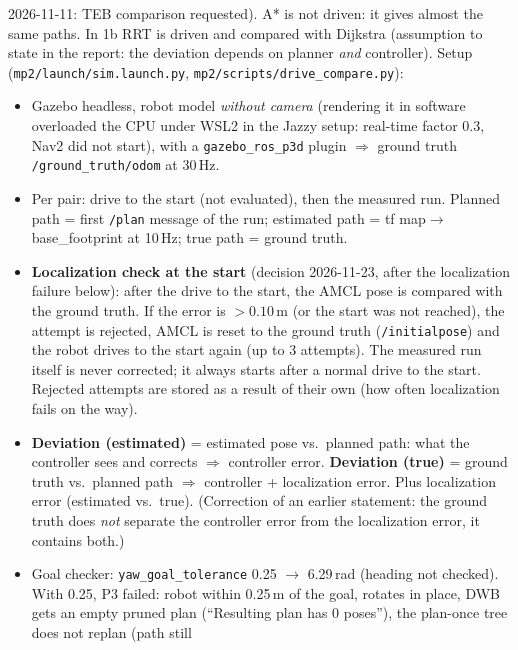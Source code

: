 \documentclass[10pt]{article}
\newcommand{\pkg}[1]{\texttt{#1}}
\begin{document}
\begin{itemize}
        2026-11-11: TEB comparison requested). A* is not driven: it gives almost the same paths. In 1b RRT is driven
        and compared with Dijkstra (assumption to state in the report: the deviation depends on planner \emph{and}
        controller).
        Setup (\pkg{mp2/launch/sim.launch.py}, \pkg{mp2/scripts/drive\_compare.py}):
        \begin{itemize}
          \item Gazebo headless, robot model \emph{without camera} (rendering it in software overloaded the CPU
                under WSL2 in the Jazzy setup: real-time factor 0.3, Nav2 did not start), with a \pkg{gazebo\_ros\_p3d}
                plugin $\Rightarrow$ ground truth \pkg{/ground\_truth/odom} at 30\,Hz.
          \item Per pair: drive to the start (not evaluated), then the measured run. Planned path = first
                \pkg{/plan} message of the run; estimated path = tf map$\rightarrow$base\_footprint at 10\,Hz;
                true path = ground truth.
          \item \textbf{Localization check at the start} (decision 2026-11-23, after the localization failure below):
                after the drive to the start, the AMCL pose is compared with the ground truth. If the error is
                $> 0.10$\,m (or the start was not reached), the attempt is rejected, AMCL is reset to the ground
                truth (\pkg{/initialpose}) and the robot drives to the start again (up to 3 attempts). The measured
                run itself is never corrected; it always starts after a normal drive to the start. Rejected attempts
                are stored as a result of their own (how often localization fails on the way).
          \item \textbf{Deviation (estimated)} = estimated pose vs.\ planned path: what the controller sees and
                corrects $\Rightarrow$ controller error. \textbf{Deviation (true)} = ground truth vs.\ planned
                path $\Rightarrow$ controller + localization error. Plus localization error (estimated vs.\ true).
                (Correction of an earlier statement: the ground truth does \emph{not} separate the controller
                error from the localization error, it contains both.)
          \item Goal checker: \pkg{yaw\_goal\_tolerance} 0.25 $\rightarrow$ 6.29\,rad (heading not checked).
                With 0.25, P3 failed: robot within 0.25\,m of the goal, rotates in place, DWB gets an empty
                pruned plan (``Resulting plan has 0 poses''), the plan-once tree does not replan (path still

\end{itemize}
\end{itemize}
\end{document}
